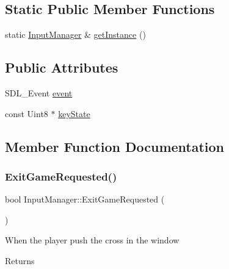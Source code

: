 \subsection*{Static Public Member Functions}
\begin{DoxyCompactItemize}
\item 
static \mbox{\hyperlink{class_input_manager}{Input\+Manager}} \& \mbox{\hyperlink{class_input_manager_afd3f100b1aded300cb79682bfa75f001}{get\+Instance}} ()
\end{DoxyCompactItemize}
\subsection*{Public Attributes}
\begin{DoxyCompactItemize}
\item 
S\+D\+L\+\_\+\+Event \mbox{\hyperlink{class_input_manager_af4889753f2148b02fe0fba6300d283d2}{event}}
\item 
const Uint8 $\ast$ \mbox{\hyperlink{class_input_manager_ac4a1f49b858f90ecdc487157f5e43f3a}{key\+State}}
\end{DoxyCompactItemize}


\subsection{Member Function Documentation}
\mbox{\label{class_input_manager_a1c2f91069dcc0cc7c47947cc56e5846b}} 
\subsubsection{\texorpdfstring{Exit\+Game\+Requested()}{ExitGameRequested()}}
{\footnotesize\ttfamily bool Input\+Manager\+::\+Exit\+Game\+Requested (\begin{DoxyParamCaption}{ }\end{DoxyParamCaption})}



When the player push the cross in the window 

\begin{DoxyReturn}{Returns}

\end{DoxyReturn}
\mbox{\label{class_input_manager_afd3f100b1aded300cb79682bfa75f001}} 

